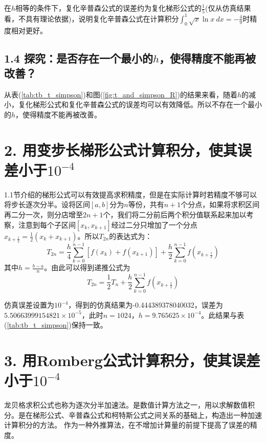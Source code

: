 在$h$相等的条件下，复化辛普森公式的误差约为复化梯形公式的$\frac{1}{5}$(仅从仿真结果看，不具有理论依据)，说明复化辛普森公式在计算积分$\int_{0}^{1} \sqrt{x} \ln x  \ dx = -\frac{4}{9}$时精度相对更好。

\subsection*{1.4 探究：是否存在一个最小的$h$，使得精度不能再被改善？}

从表(\ref{tab:tb_t_simpson})和图(\ref{fig:t_and_simpson_R})的结果来看，随着$h$的减小，复化梯形公式和复化辛普森公式的误差均可以有效降低。所以不存在一个最小的$h$，使得精度不能再被改善。

\section*{2. 用变步长梯形公式计算积分，使其误差小于$10^{-4}$}

1.1节介绍的梯形公式可以有效提高求积精度，但是在实际计算时若精度不够可以将步长逐次分半。设将区间$[a,b]$分为$n$等份，共有$n+1$个分点，如果将求积区间再二分一次，则分店增至$2n+1$个，我们将二分前后两个积分值联系起来加以考察，注意到每个子区间$[x_k, x_{k+1}]$经过二分只增加了一个分点$x_{k+\frac{1}{2}} = \frac{1}{2}(x_k + x_{k+1})$。所以$T_{2n}$的表达式为：
\begin{equation}
    T_{2n} = \frac{h}{4} \sum_{k=0}^{n-1} [f(x_k) + f(x_{k+1})] + \frac{h}{2} \sum_{k=0}^{n-1} f(x_{k+\frac{1}{2}})
    \label{eq:step_changing_T_2n}
\end{equation}
其中$h=\frac{b-a}{n}$。由此可以得到递推公式为
\begin{equation}
    T_{2n} = \frac{1}{2} T_n + \frac{h}{2} \sum_{k=0}^{n-1} f(x_{k+\frac{1}{2}})
    \label{eq:step_changing_T_n_T_2n}
\end{equation}

仿真误差设置为$10^{-4}$，得到的仿真结果为-0.444389378040032，误差为$5.50663999154821\times10^{-5}$，此时$n=1024$，$h = 9.765625\times 10^{-4}$。此结果与表(\ref{tab:tb_t_simpson})保持一致。

\section*{3. 用Romberg公式计算积分，使其误差小于$10^{-4}$}

龙贝格求积公式也称为逐次分半加速法。是数值计算方法之一，用以求解数值积分。是在梯形公式、辛普森公式和柯特斯公式之间关系的基础上，构造出一种加速计算积分的方法。 作为一种外推算法，在不增加计算量的前提下提高了误差的精度。

